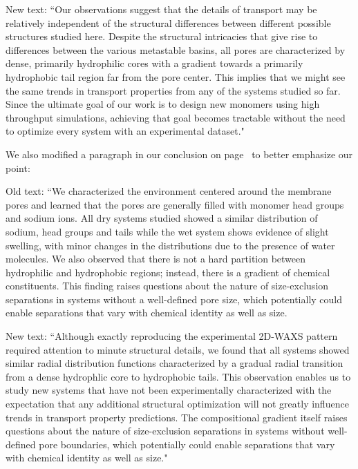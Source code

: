 \documentclass{article}
\begin{document}
\begin{enumerate}
    New text: ``Our observations suggest that the details of transport may be
    relatively independent of the structural differences between different possible
    structures studied here. Despite the structural intricacies that give rise to
    differences between the various metastable basins, all pores are characterized
    by dense, primarily hydrophilic cores with a gradient towards a primarily
    hydrophobic tail region far from the pore center. This implies that we might
    see the same trends in transport properties from any of the systems studied so
    far. Since the ultimate goal of our work is to design new monomers using high
    throughput simulations, achieving that goal becomes tractable without the need
    to optimize every system with an experimental dataset."
	
    We also modified a paragraph in our conclusion on page~\pageref{M-rework:conclusion}
    to better emphasize our point:

    Old text: ``We characterized the environment centered around the membrane
    pores and learned that the pores are generally filled with monomer head groups
    and sodium ions. All dry systems studied showed a similar distribution of
    sodium, head groups and tails while the wet system shows evidence of slight
    swelling, with minor changes in the distributions due to the presence of water
    molecules. We also observed that there is not a hard partition between
    hydrophilic and hydrophobic regions; instead, there is a gradient of chemical
    constituents. This finding raises questions about the nature of size-exclusion
    separations in systems without a well-defined pore size, which potentially
    could enable separations that vary with chemical identity as well as size. 	

    New text: ``Although exactly reproducing the experimental 2D-WAXS pattern
    required attention to minute structural details, we found that all systems
    showed similar radial distribution functions characterized by a gradual radial
    transition from a dense hydrophlic core to hydrophobic tails. This observation
    enables us to study new systems that have not been experimentally characterized
    with the expectation that any additional structural optimization will not
    greatly influence trends in transport property predictions. The compositional
    gradient itself raises questions about the nature of size-exclusion separations
    in systems without well-defined pore boundaries, which potentially could enable
    separations that vary with chemical identity as well as size."
	

\end{enumerate}
\end{document}
